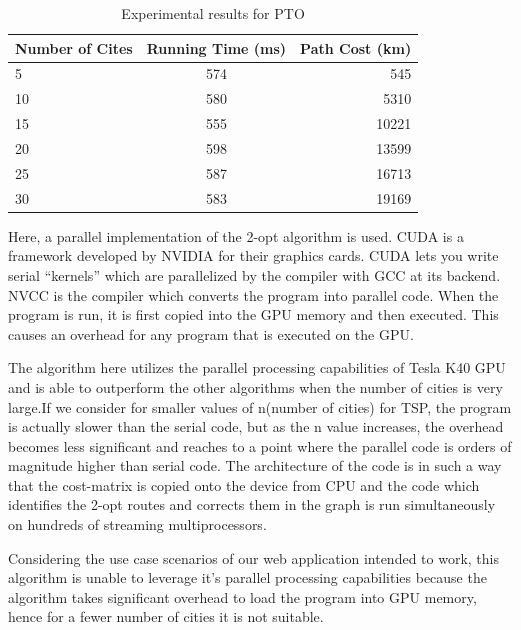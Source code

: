 \documentclass[conference]{IEEEtran}
\begin{document}
\begin{table}[h!]
  \begin{center}
    \label{tab:table3}
    \begin{tabular}{l|c|r}
      \textbf{Number of Cites} & \textbf{Running Time (ms)} & \textbf{Path Cost (km)}\\
      \hline
      5 & 574 & 545\\
      10 & 580 & 5310\\
      15 & 555 & 10221\\
      20 & 598 & 13599\\ 
      25 & 587 & 16713\\
      30 & 583 & 19169\\
    \end{tabular}
    \caption{Experimental results for PTO}
  \end{center}
\end{table}



Here, a parallel implementation of the 2-opt algorithm is used. CUDA is a framework developed by NVIDIA for their graphics cards. CUDA lets you write serial “kernels” which are parallelized by the compiler with GCC at its backend. NVCC is the compiler which converts the program into parallel code. When the program is run, it is first copied into the GPU memory and then executed. This causes an overhead for any program that is executed on the GPU. 

 The algorithm here utilizes the parallel processing capabilities of Tesla K40 GPU and is able to outperform the other algorithms when the number of cities is very large.If we consider for smaller values of n(number of cities) for TSP, the program is actually slower than the serial code, but as the n value increases, the overhead becomes less significant and reaches to a point where the parallel code is orders of magnitude higher than serial code. The architecture of the code is in such a way that the cost-matrix is copied onto the device from CPU and the code which identifies the 2-opt routes and corrects them in the graph is run simultaneously on hundreds of streaming multiprocessors. 

 Considering the use case scenarios of our web application intended to work, this algorithm is unable to leverage it’s parallel processing capabilities because the algorithm takes significant overhead to load the program into GPU memory, hence for a fewer number of cities it is not suitable.
\end{document}
